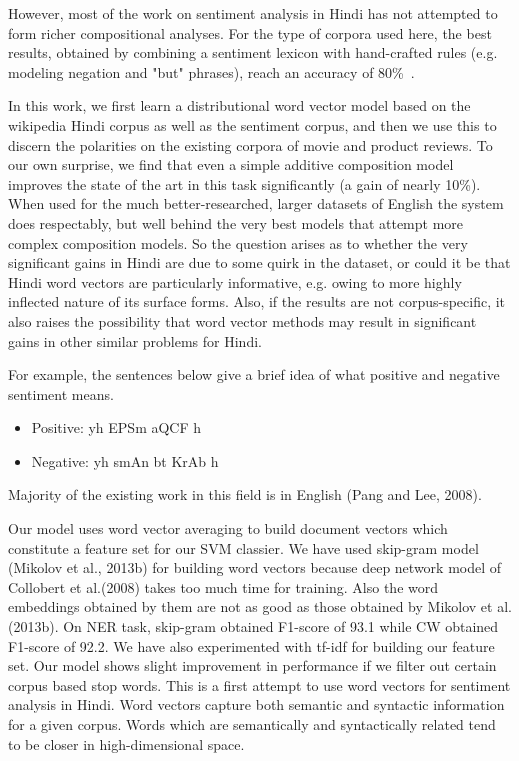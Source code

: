 However, most of the work on sentiment analysis in Hindi has not attempted to form richer compositional analyses.   For the type of corpora used here, the best results, obtained by combining a sentiment lexicon with hand-crafted rules (e.g. modeling negation and "but" phrases), reach an accuracy of 80\%~\cite{Mittal:13}.

In this work, we first learn a distributional word vector model based on the wikipedia Hindi corpus as well as the sentiment corpus, and then we use this to discern the polarities on the existing corpora of movie and product reviews. To our own surprise, we find that even a simple additive composition model improves the state of the art in this task significantly (a gain of nearly
10\%). When used for the much better-researched, larger datasets of English the system does respectably, but well behind the very best models that attempt more complex composition models. 
So the question arises as to whether the very significant gains in Hindi are due to some quirk in the dataset, or could it be that Hindi word vectors are particularly informative,
e.g. owing to more highly inflected nature of its surface forms.  Also, if the results are not corpus-specific, it also raises the possibility that word vector methods may result in significant gains in
other similar problems for Hindi. 

For example, the sentences below give a brief idea of what positive and negative sentiment means.
\begin{itemize}
\item Positive: {\dn yh EPSm aQCF h\4}
\item Negative: {\dn yh smAn bt KrAb h\4}
\end{itemize}
Majority of the existing work in this field is in English (Pang and Lee, 2008).

Our model uses word vector averaging to build document vectors which constitute a feature set for our SVM classier. We have used skip-gram model (Mikolov et al., 2013b) for building word vectors because deep network model of Collobert et al.(2008) takes too much time for training. Also the word embeddings obtained by them are not as good as those obtained by Mikolov et al.(2013b). On NER task, skip-gram obtained F1-score of 93.1 while CW obtained F1-score of 92.2. We have also experimented with tf-idf for building our feature set. Our model shows slight improvement in performance if we filter out certain corpus based stop words. This is a first attempt to use word vectors for sentiment analysis in Hindi. Word vectors capture both semantic and syntactic information for a given corpus. Words which are semantically and syntactically related tend to be closer in high-dimensional space.\\

